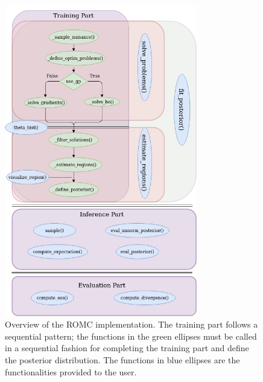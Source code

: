 \begin{figure}[!ht]
    \begin{center}
      \includegraphics[width=0.75\textwidth]{./Thesis/graphs/ROMC.png}
    \end{center}
    \caption{Overview of the ROMC implementation. The training part
      follows a sequential pattern; the functions in the green
      ellipses must be called in a sequential fashion for completing
      the training part and define the posterior distribution. The
      functions in blue ellipses are the functionalities provided to
      the user.}
    \label{fig:elfi-model}
\end{figure}

  